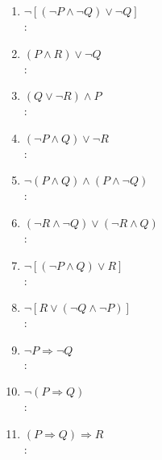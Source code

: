 \begin{enumerate}[label=0.1.\arabic*]
\begin{enumerate}[label=(\arabic*)]
		\item $ \neg [ ( \neg P \wedge \neg Q ) \vee \neg Q ] $ \\
		\solucion: \\
		
		\item $ (P \wedge R) \vee \neg Q $ \\
		\solucion: \\
		
		\item $ (Q \vee \neg R) \wedge P $ \\
		\solucion: \\
		
		\item $ ( \neg P \wedge Q ) \vee \neg R $ \\
		\solucion: \\
		
		\item $ \neg ( P \wedge Q ) \wedge (P \wedge \neg Q) $ \\
		\solucion: \\
		
		\item $ (\neg R \wedge \neg Q) \vee (\neg R \wedge Q) $ \\
		\solucion: \\
		
		\item $ \neg [ ( \neg P \wedge Q ) \vee R ] $ \\
		\solucion: \\
		
		\item $ \neg [ R \vee ( \neg Q \wedge \neg P ) ] $ \\
		\solucion: \\
		
		\item $ \neg P \Longrightarrow \neg Q $ \\
		\solucion: \\
		
		\item $ \neg (P \Longrightarrow Q) $ \\
		\solucion: \\
		
		\item $ ( P \Longrightarrow Q ) \Longrightarrow R $ \\
		\solucion: \\
		

\end{enumerate}
\end{enumerate}
